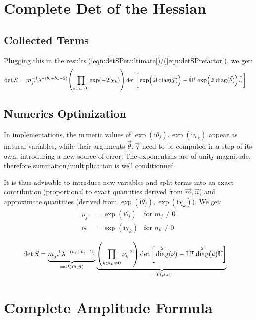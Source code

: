 \documentclass[
	english,
	a4paper,
	fontsize=10pt,
	parskip=half,
	titlepage=true,
	DIV=12,
	final
]{scrreprt}
\newcommand*{\transp}{\ensuremath{^\intercal}}
\newcommand*{\iunit}{\ensuremath{\mathrm{i}}}
\DeclareMathOperator{\diag}{diag}
\begin{document}
\section{Complete Det of the Hessian}
\subsection{Collected Terms}
Plugging this in the results (\ref{eqn:detSPenultimate})/(\ref{eqn:detSPrefactor}), we get:
\begin{align}
	\det S
&=
	m_{j^*}^{-1} \lambda^{-(b_i + b_o - 2)}
	\qty( \prod_{k: n_k \neq 0} \exp(-2\iunit \chi_k) )
	\det\qty[\bigg.
		\exp(\Big. 
			2\iunit 
			\diag(\vec{\chi})
		)
		-
		\tilde{\mathbb{U}}\transp
		\exp(
			2\iunit 
			\diag(\vec{\theta})
		)
		\tilde{\mathbb{U}}
	]
\end{align}

\subsection{Numerics Optimization}
In implementations, the numeric values of $\exp(\iunit \theta_j), \exp(\iunit \chi_k)$ appear as natural variables, while their arguments $\vec{\theta}, \vec{\chi}$ need to be computed in a step of its own, introducing a new source of error. The exponentials are of unity magnitude, therefore summation/multiplication is well conditionned.

It is thus advisable to introduce new variables and split terms into an exact contribution (proportional to exact quantities derived from $\vec{m}, \vec{n}$) and approximate quantities (derived from $\exp(\iunit \theta_j), \exp(\iunit \chi_k)$). We get:
\begin{align}
	\mu_j &= \exp(\iunit \theta_j) & \text{for } m_j \neq 0 \\
	\nu_k &= \exp(\iunit \chi  _k) & \text{for } n_k \neq 0 \\
\end{align}
\begin{align}
	\det S
&=
	\underbrace{
		m_{j^*}^{-1} \lambda^{-(b_i + b_o - 2)}
	}_{\eqqcolon \Omega(\vec{m}, \vec{n})}
	\underbrace{
		\qty( \prod_{k: n_k \neq 0} \nu_k^{-2} )
		\det\qty[\bigg.
				\diag^2(\vec{\nu})
			-
			\tilde{\mathbb{U}}\transp
			\diag^2(\vec{\mu})
			\tilde{\mathbb{U}}
		]
	}_{=\Upsilon(\vec{\mu}, \vec{\nu})}
\end{align}


\section{Complete Amplitude Formula}
\end{document}
